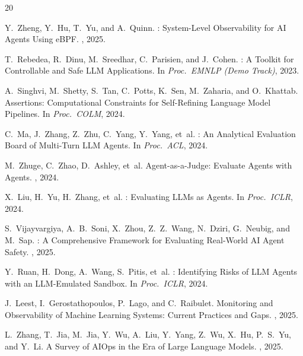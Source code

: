 \documentclass[sigplan,10pt,screen]{acmart}
\begin{document}
\begin{thebibliography}{20}

Y.~Zheng, Y.~Hu, T.~Yu, and A.~Quinn.
: System-Level Observability for {AI} Agents Using {eBPF}.
, 2025.

T.~Rebedea, R.~Dinu, M.~Sreedhar, C.~Parisien, and J.~Cohen.
: A Toolkit for Controllable and Safe {LLM}
  Applications.
\newblock In {\em Proc.\ EMNLP (Demo Track)}, 2023.

A.~Singhvi, M.~Shetty, S.~Tan, C.~Potts, K.~Sen, M.~Zaharia, and O.~Khattab.
 Assertions: Computational Constraints for Self-Refining
  Language Model Pipelines.
\newblock In {\em Proc.\ COLM}, 2024.

C.~Ma, J.~Zhang, Z.~Zhu, C.~Yang, Y.~Yang, et~al.
: An Analytical Evaluation Board of Multi-Turn {LLM}
  Agents.
\newblock In {\em Proc.\ ACL}, 2024.

M.~Zhuge, C.~Zhao, D.~Ashley, et~al.
\newblock Agent-as-a-Judge: Evaluate Agents with Agents.
, 2024.

X.~Liu, H.~Yu, H.~Zhang, et~al.
: Evaluating {LLMs} as Agents.
\newblock In {\em Proc.\ ICLR}, 2024.

S.~Vijayvargiya, A.~B.~Soni, X.~Zhou, Z.~Z.~Wang, N.~Dziri, G.~Neubig, and
  M.~Sap.
: A Comprehensive Framework for Evaluating
  Real-World {AI} Agent Safety.
, 2025.

Y.~Ruan, H.~Dong, A.~Wang, S.~Pitis, et~al.
: Identifying Risks of {LLM} Agents with an {LLM}-Emulated
  Sandbox.
\newblock In {\em Proc.\ ICLR}, 2024.

J.~Leest, I.~Gerostathopoulos, P.~Lago, and C.~Raibulet.
\newblock Monitoring and Observability of Machine Learning Systems: Current
  Practices and Gaps.
, 2025.

L.~Zhang, T.~Jia, M.~Jia, Y.~Wu, A.~Liu, Y.~Yang, Z.~Wu, X.~Hu, P.~S.~Yu,
  and Y.~Li.
\newblock A Survey of {AIOps} in the Era of Large Language Models.
, 2025.


\end{thebibliography}
\end{document}
